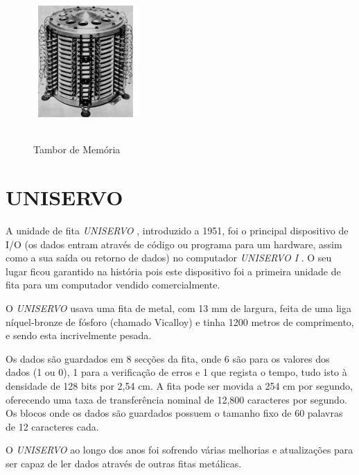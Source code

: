 \documentclass{report}
\begin{document}
	\begin{figure}[h]
		\centering
		\includegraphics[width=4cm, height=6cm]{tambordememoria.jpg}
		\caption{Tambor de Memória}
		\end{figure}

\newpage

	\section{UNISERVO}

	A unidade de fita \textit{UNISERVO}  , introduzido a 1951, foi o principal dispositivo de I/O (os dados entram através de código ou programa para um hardware, assim como a sua saída ou retorno de dados) no computador \textit{UNISERVO I} . O seu lugar ficou garantido na história pois este dispositivo foi a primeira unidade de fita para um computador vendido comercialmente. 
\vspace{1mm}	
	
	O \textit{UNISERVO}  usava uma fita de metal, com 13 mm de largura, feita de uma liga níquel-bronze de fósforo (chamado Vicalloy) e tinha 1200 metros de comprimento, e sendo esta incrivelmente pesada.
\vspace{1mm}
	
	Os dados são guardados em 8 secções da fita, onde 6 são para os valores dos dados (1 ou 0), 1 para a verificação de erros e 1 que regista o tempo, tudo isto à densidade de 128 bits por 2,54 cm. A fita pode ser movida a 254 cm por segundo, oferecendo uma taxa de transferência nominal de 12,800 caracteres por segundo. Os blocos onde os dados são guardados possuem o tamanho fixo de 60 palavras de 12 caracteres cada.
\vspace{1mm}
	
	O \textit{UNISERVO}  ao longo dos anos foi sofrendo várias melhorias e atualizações para ser capaz de ler dados através de outras fitas metálicas.
\end{document}
